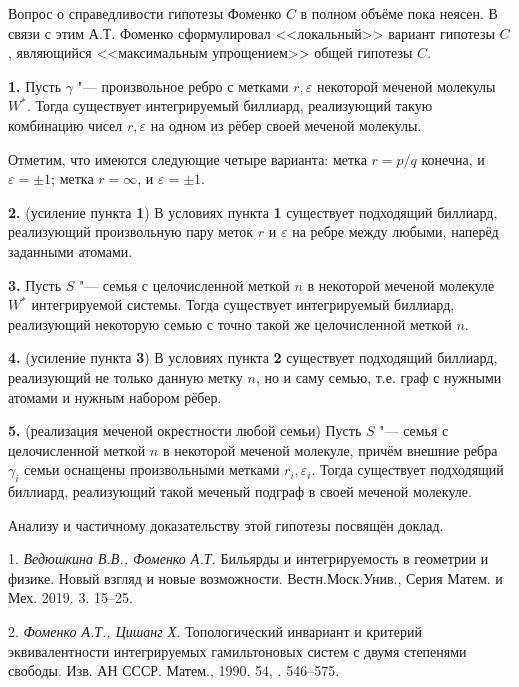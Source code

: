 Вопрос о справедливости гипотезы Фоменко $C$ в полном объёме пока неясен. В связи с этим А.Т. Фоменко сформулировал <<локальный>> вариант гипотезы $C$, являющийся <<максимальным упрощением>> общей гипотезы $C$.

\textbf{1.} Пусть $\gamma$ "--- произвольное ребро с метками $r, \varepsilon$ некоторой меченой молекулы $W^{*}$. Тогда существует интегрируемый биллиард, реализующий такую комбинацию чисел $r, \varepsilon$ на одном из рёбер своей меченой молекулы.

Отметим, что имеются следующие четыре варианта: метка $r = p \slash q$ конечна, и $\varepsilon = \pm 1$; метка $r = \infty$, и $\varepsilon = \pm 1$.

\textbf{2. } (усиление пункта \textbf{1}) В условиях пункта \textbf{1} существует подходящий биллиард, реализующий произвольную пару меток $r$ и $\varepsilon$ на ребре между любыми, наперёд заданными атомами.

\textbf{3.} Пусть $S$ "--- семья с целочисленной меткой $n$ в некоторой меченой молекуле $W^{*}$ интегрируемой системы. Тогда существует интегрируемый биллиард, реализующий некоторую семью с точно такой же целочисленной меткой $n$.

\textbf{4. } (усиление пункта \textbf{3}) В условиях пункта \textbf{2} существует подходящий биллиард, реализующий не только данную метку $n$, но и саму семью, т.е. граф с нужными атомами и нужным набором рёбер.

\textbf{5. } (реализация меченой окрестности любой семьи) Пусть $S$ "--- семья с целочисленной меткой $n$ в некоторой меченой молекуле, причём внешние ребра $\gamma_i$ семьи оснащены произвольными метками $r_i, \varepsilon_i$. Тогда существует подходящий биллиард, реализующий такой меченый подграф в своей меченой молекуле.


Анализу и частичному доказательству этой гипотезы посвящён доклад.




\litlist

1. {\it Ведюшкина В.В., Фоменко А.Т.} Бильярды и интегрируемость в геометрии и физике. Новый взгляд и новые возможности. Вестн.Моск.Унив., Серия Матем. и Мех. 2019. 3. 15--25.

2. {\it Фоменко А.Т., Цишанг Х.} Топологический инвариант и критерий
эквивалентности интегрируемых гамильтоновых систем с двумя степенями
свободы. Изв. АН СССР. Матем.,
1990. 54, .
 546--575.
